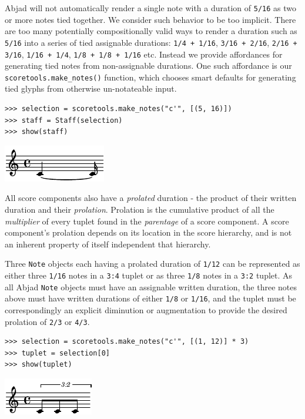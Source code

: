 Abjad will not automatically render a single note with a duration of
\texttt{5/16} as two or more notes tied together. We consider such behavior to
be too implicit. There are too many potentially compositionally valid ways to
render a duration such as \texttt{5/16} into a series of tied assignable
durations: \texttt{1/4 + 1/16}, \texttt{3/16 + 2/16}, \texttt{2/16 + 3/16},
\texttt{1/16 + 1/4}, \texttt{1/8 + 1/8 + 1/16} etc. Instead we provide
affordances for generating tied notes from non-assignable durations. One such
affordance is our \texttt{scoretools.make\_notes()} function, which chooses
smart defaults for generating tied glyphs from otherwise un-notateable input.

\begin{lstlisting}
>>> selection = scoretools.make_notes("c'", [(5, 16)])
>>> staff = Staff(selection)
>>> show(staff)
\end{lstlisting}

\includegraphics[scale=1.0]{images/notational_isomorphism-4.pdf}


All score components also have a \emph{prolated} duration - the product of
their written duration and their \emph{prolation}. Prolation is the cumulative
product of all the \emph{multiplier} of every tuplet found in the
\emph{parentage} of a score component. A score component's prolation depends on
its location in the score hierarchy, and is not an inherent property of itself
independent that hierarchy.

Three \texttt{Note} objects each having a prolated duration of \texttt{1/12}
can be represented as either three \texttt{1/16} notes in a \texttt{3:4} tuplet
or as three \texttt{1/8} notes in a \texttt{3:2} tuplet. As all Abjad
\texttt{Note} objects must have an assignable written duration, the three notes
above must have written durations of either \texttt{1/8} or \texttt{1/16}, and
the tuplet must be correspondingly an explicit diminution or augmentation to
provide the desired prolation of \texttt{2/3} or \texttt{4/3}.

\begin{lstlisting}
>>> selection = scoretools.make_notes("c'", [(1, 12)] * 3)
>>> tuplet = selection[0]
>>> show(tuplet)
\end{lstlisting}

\includegraphics[scale=1.0]{images/notational_isomorphism-5.pdf}

